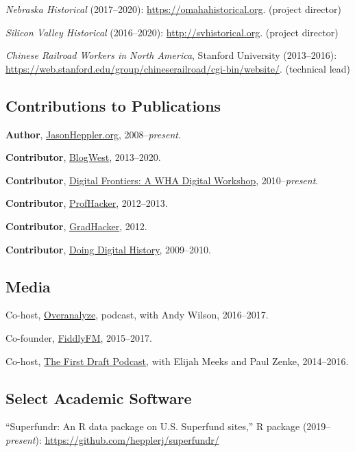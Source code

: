 \documentclass[10pt]{article}
\begin{document}
\textit{Nebraska Historical} (2017--2020): \url{https://omahahistorical.org}. (project director)

\textit{Silicon Valley Historical} (2016--2020): \url{http://svhistorical.org}. (project director)

\textit{Chinese Railroad Workers in North America}, Stanford University (2013--2016): \url{https://web.stanford.edu/group/chineserailroad/cgi-bin/website/}. (technical lead)

\subsection*{Contributions to Publications}

\textbf{Author}, \href{http://jasonheppler.org}{JasonHeppler.org}, 2008--\textit{present}.

\textbf{Contributor}, \href{http://blogwest.org/}{BlogWest}, 2013--2020.

\textbf{Contributor}, \href{http://whadigitalfrontiers.com/}{Digital Frontiers: A WHA Digital Workshop}, 2010--\textit{present}.

\textbf{Contributor}, \href{http://chronicle.com/blogs/profhacker/}{ProfHacker}, 2012--2013.

\textbf{Contributor}, \href{https://www.insidehighered.com/blogs/gradhacker}{GradHacker}, 2012.

\textbf{Contributor}, \href{http://digitalhistory.unl.edu/}{Doing Digital History}, 2009--2010.

\subsection{Media}

Co-host, \href{http://overanalyze.fireside.fm}{Overanalyze}, podcast, with Andy Wilson, 2016--2017.

Co-founder, \href{http://fiddly.fm}{FiddlyFM}, 2015--2017.

Co-host, \href{http://www.fiddly.fm/firstdraft/}{The First Draft Podcast}, with Elijah Meeks and Paul Zenke, 2014--2016.

\subsection{Select Academic Software}

``Superfundr: An R data package on U.S. Superfund sites,'' R package (2019--\textit{present}): \url{https://github.com/hepplerj/superfundr/}
\end{document}
